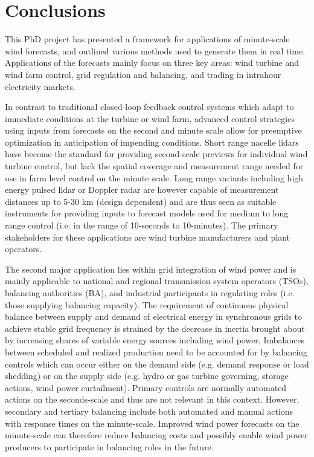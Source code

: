 \chapter{Conclusions}
\label{sec:conclusions}

\clearpage

This PhD project has presented a framework for applications of minute-scale wind forecasts, and outlined various methods used to generate them in real time. Applications of the forecasts mainly focus on three key areas: wind turbine and wind farm control, grid regulation and balancing, and trading in intrahour electricity markets. 

In contrast to traditional closed-loop feedback control systems which adapt to immediate conditions at the turbine or wind farm, advanced control strategies using inputs from forecasts on the second and minute scale allow for preemptive optimization in anticipation of impending conditions. Short range nacelle lidars have become the standard for providing second-scale previews for individual wind turbine control, but lack the spatial coverage and measurement range needed for use in farm level control on the minute scale. Long range variants including high energy pulsed lidar or Doppler radar are however capable of measurement distances up to 5-30 km (design dependent) and are thus seen as suitable instruments for providing inputs to forecast models used for medium to long range control (i.e. in the range of 10-seconds to 10-minutes). The primary stakeholders for these applications are wind turbine manufacturers and plant operators.

The second major application lies within grid integration of wind power and is mainly applicable to national and regional transmission system operators (TSOs), balancing authorities (BA), and industrial participants in regulating roles (i.e. those supplying balancing capacity). The requirement of continuous physical balance between supply and demand of electrical energy in synchronous grids to achieve stable grid frequency is strained by the decrease in inertia brought about by increasing shares of variable energy sources including wind power. Imbalances between scheduled and realized production need to be accounted for by balancing controls which can occur either on the demand side (e.g. demand response or load shedding) or on the supply side (e.g. hydro or gas turbine governing, storage actions, wind power curtailment). Primary controls are normally automated actions on the seconds-scale and thus are not relevant in this context. However, secondary and tertiary balancing include both automated and manual actions with response times on the minute-scale. Improved wind power forecasts on the minute-scale can therefore reduce balancing costs and possibly enable wind power producers to participate in balancing roles in the future.

